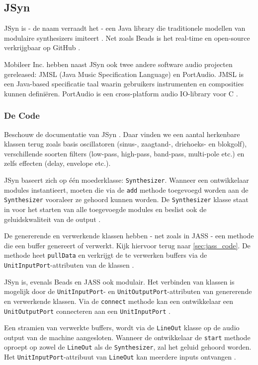 \subsection{JSyn}

JSyn is - de naam verraadt het - een Java library die traditionele modellen van modulaire synthesizers imiteert \autocite{jsyn}. Net zoals Beads is het real-time en open-source verkrijgbaar op GitHub \autocite{jsyngit}.

Mobileer Inc. hebben naast JSyn ook twee andere software audio projecten gereleased: JMSL (Java Music Specification Language) en PortAudio. JMSL is een Java-based specificatie taal waarin gebruikers instrumenten en composities kunnen definiëren. PortAudio is een cross-platform audio IO-library voor C \autocite{jsyn}.

\subsubsection*{De Code}

Beschouw de documentatie van JSyn \autocite{jsyndocs}. Daar vinden we een aantal herkenbare klassen terug zoals basis oscillatoren (sinus-, zaagtand-, driehoeks- en blokgolf), verschillende soorten filters (low-pass, high-pass, band-pass, multi-pole etc.) en zelfs effecten (delay, envelope etc.).

JSyn baseert zich op één moederklasse: \verb+Synthesizer+. Wanneer een ontwikkelaar modules instantieert, moeten die via de \verb+add+ methode toegevoegd worden aan de \verb+Synthesizer+ vooraleer ze gehoord kunnen worden. De \verb+Synthesizer+ klasse staat in voor het starten van alle toegevoegde modules en beslist ook de geluidskwaliteit van de output \autocite{jsyndocs}.

De genererende en verwerkende klassen hebben - net zoals in JASS - een methode die een buffer genereert of verwerkt. Kijk hiervoor terug naar \ref{sec:jass_code}. De methode heet \verb+pullData+ en verkrijgt de te verwerken buffers via de \verb+UnitInputPort+-attributen van de klassen \autocite{jsyndocs}.

JSyn is, evenals Beads en JASS ook modulair. Het verbinden van klassen is mogelijk door de \verb+UnitInputPort+- en \verb+UnitOutputPort+-attributen van genererende en verwerkende klassen. Via de \verb+connect+ methode kan een ontwikkelaar een \verb+UnitOutputPort+ connecteren aan een \verb+UnitInputPort+ \autocite{jsyndocs}.

Een stramien van verwerkte buffers, wordt via de \verb+LineOut+ klasse op de audio output van de machine aangesloten. Wanneer de ontwikkelaar de \verb+start+ methode oproept op zowel de \verb+LineOut+ als de \verb+Synthesizer+, zal het geluid gehoord worden. Het \verb+UnitInputPort+-attribuut van \verb+LineOut+ kan meerdere inputs ontvangen \autocite{jsyndocs}.

